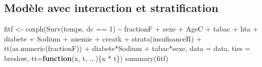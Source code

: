 \documentclass[
  letterpaper,
  DIV=11,
  numbers=noendperiod]{scrartcl}
\newenvironment{Shaded}{\begin{snugshade}}{\end{snugshade}}
\newcommand{\AttributeTok}[1]{\textcolor[rgb]{0.40,0.45,0.13}{#1}}
\newcommand{\ControlFlowTok}[1]{\textcolor[rgb]{0.00,0.23,0.31}{\textbf{#1}}}
\newcommand{\DecValTok}[1]{\textcolor[rgb]{0.68,0.00,0.00}{#1}}
\newcommand{\FunctionTok}[1]{\textcolor[rgb]{0.28,0.35,0.67}{#1}}
\newcommand{\NormalTok}[1]{\textcolor[rgb]{0.00,0.23,0.31}{#1}}
\newcommand{\OtherTok}[1]{\textcolor[rgb]{0.00,0.23,0.31}{#1}}
\newcommand{\SpecialCharTok}[1]{\textcolor[rgb]{0.37,0.37,0.37}{#1}}
\newcommand{\StringTok}[1]{\textcolor[rgb]{0.13,0.47,0.30}{#1}}
\begin{document}
\subsection{Modèle avec interaction et
stratification}\label{moduxe8le-avec-interaction-et-stratification}

\begin{Shaded}
\begin{Highlighting}[]
\NormalTok{fitf }\OtherTok{\textless{}{-}} \FunctionTok{coxph}\NormalTok{(}\FunctionTok{Surv}\NormalTok{(temps, dc }\SpecialCharTok{==} \DecValTok{1}\NormalTok{) }\SpecialCharTok{\textasciitilde{}}\NormalTok{ fractionF }\SpecialCharTok{+}\NormalTok{ sexe }\SpecialCharTok{+}\NormalTok{ AgeC }\SpecialCharTok{+}\NormalTok{ tabac }\SpecialCharTok{+}\NormalTok{ hta }\SpecialCharTok{+}\NormalTok{ diabete }\SpecialCharTok{+}\NormalTok{ Sodium }\SpecialCharTok{+}\NormalTok{ anemie }\SpecialCharTok{+}\NormalTok{ creatk }\SpecialCharTok{+} \FunctionTok{strata}\NormalTok{(insufisanceR) }\SpecialCharTok{+} \FunctionTok{tt}\NormalTok{(}\FunctionTok{as.numeric}\NormalTok{(fractionF)) }\SpecialCharTok{+}\NormalTok{ diabete}\SpecialCharTok{*}\NormalTok{Sodium }\SpecialCharTok{+}\NormalTok{ tabac}\SpecialCharTok{*}\NormalTok{sexe, }
              \AttributeTok{data =}\NormalTok{ data, }\AttributeTok{ties =} \StringTok{\textquotesingle{}breslow\textquotesingle{}}\NormalTok{, }\AttributeTok{tt=}\ControlFlowTok{function}\NormalTok{(x, t, ...)\{x }\SpecialCharTok{*}\NormalTok{ t\})}
\FunctionTok{summary}\NormalTok{(fitf)}
\end{Highlighting}
\end{Shaded}
\end{document}
